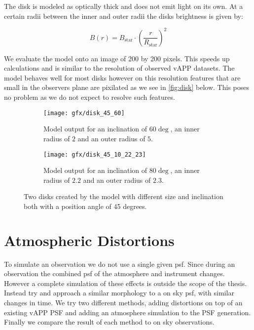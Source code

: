 The disk is modeled as optically thick and does not emit light on its own. At a certain radii between the inner and outer radii the disks brightness is given by:

\begin{equation}
B(r) = B_{\text{star}} \cdot {\left(\frac{r}{R_{\text{star}}}\right)}^2
\end{equation}

We evaluate the model onto an image of 200 by 200 pixels. This speeds up calculations and is similar to the resolution of observed \ac{vAPP} datasets. The model behaves well for most disks however on this resolution features that are small in the observers plane are pixilated as we see in \autoref{fig:disk} below. This poses no problem as we do not expect to resolve such features.

\begin{figure}[h!]
  \begin{subfigure}[b]{0.5\textwidth}
    \texttt{[image: gfx/disk\_45\_60]}
    \caption{Model output for an inclination of $60\deg$, an inner radius of $2$ and an outer radius of $5$.}
  \end{subfigure}
  \begin{subfigure}[b]{0.5\textwidth}
    \texttt{[image: gfx/disk\_45\_10\_22\_23]}
    \caption{Model output for an inclination of $80\deg$, an inner radius of $2.2$ and an outer radius of $2.3$.}
  \end{subfigure}
  \caption{Two disks created by the model with different size and inclination both with a position angle of 45 degrees.}
  \label{fig:disk}
\end{figure}





\section{Atmospheric Distortions}

To simulate an observation we do not use a single given psf. Since during an observation the combined psf of the atmosphere and instrument changes. However a complete simulation of these effects is outside the scope of the thesis. Instead try and approach a similar morphology to a on sky psf, with similar changes in time. We try two different methods, adding distortions on top of an existing \ac{vAPP} \ac{PSF} and adding an atmosphere simulation to the PSF generation. Finally we compare the result of each method to on sky observations.

